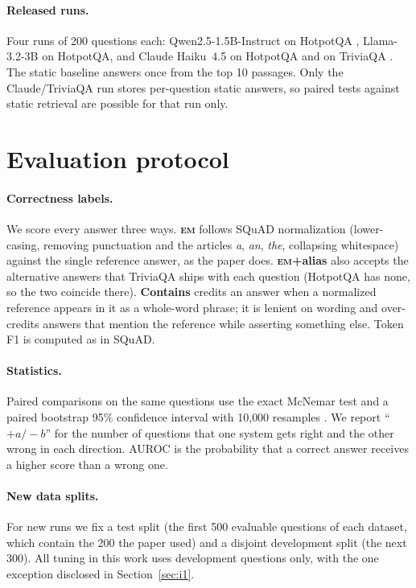 \documentclass[11pt]{article}
\newcommand{\EM}{\textsc{em}}
\begin{document}
\paragraph{Released runs.} Four runs of 200 questions each: Qwen2.5-1.5B-Instruct \citep{qwen2024qwen25} on HotpotQA \citep{yang2018hotpotqa}, Llama-3.2-3B \citep{dubey2024llama3} on HotpotQA, and Claude Haiku~4.5 on HotpotQA and on TriviaQA \citep{joshi2017triviaqa}. The static baseline answers once from the top 10 passages. Only the Claude/TriviaQA run stores per-question static answers, so paired tests against static retrieval are possible for that run only.

\section{Evaluation protocol}
\label{sec:protocol}

\paragraph{Correctness labels.} We score every answer three ways. \textbf{\EM{}} follows SQuAD normalization (lower-casing, removing punctuation and the articles \emph{a}, \emph{an}, \emph{the}, collapsing whitespace) against the single reference answer, as the paper does. \textbf{\EM{}+alias} also accepts the alternative answers that TriviaQA ships with each question (HotpotQA has none, so the two coincide there). \textbf{Contains} credits an answer when a normalized reference appears in it as a whole-word phrase; it is lenient on wording and over-credits answers that mention the reference while asserting something else. Token F1 is computed as in SQuAD.

\paragraph{Statistics.} Paired comparisons on the same questions use the exact McNemar test \citep{mcnemar1947} and a paired bootstrap 95\% confidence interval with 10{,}000 resamples \citep{efron1993bootstrap}. We report ``$+a/-b$'' for the number of questions that one system gets right and the other wrong in each direction. AUROC is the probability that a correct answer receives a higher score than a wrong one.

\paragraph{New data splits.} For new runs we fix a test split (the first 500 evaluable questions of each dataset, which contain the 200 the paper used) and a disjoint development split (the next 300). All tuning in this work uses development questions only, with the one exception disclosed in Section~\ref{sec:i1}.
\end{document}
